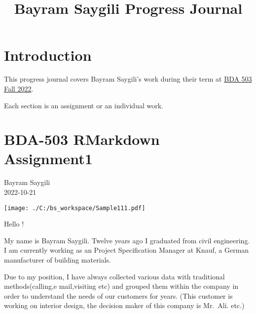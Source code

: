 \documentclass[
  letterpaper,
  DIV=11,
  numbers=noendperiod]{scrreprt}
\title{Bayram Saygili Progress Journal}
\author{}
\date{}
\renewcommand*\contentsname{Table of contents}
\newcommand\contentsname{Table of contents}
\begin{document}
\maketitle
\ifdefined\Shaded\renewenvironment{Shaded}{\begin{tcolorbox}[sharp corners, interior hidden, enhanced, borderline west={3pt}{0pt}{shadecolor}, frame hidden, boxrule=0pt, breakable]}{\end{tcolorbox}}\fi

\renewcommand*\contentsname{Table of contents}
{
\hypersetup{linkcolor=}
\setcounter{tocdepth}{2}
\tableofcontents
}

\hypertarget{introduction}{%
\chapter*{Introduction}\label{introduction}}

This progress journal covers Bayram Saygili's work during their term at
\href{https://mef-bda503.github.io/fall22/}{BDA 503 Fall 2022}.

Each section is an assignment or an individual work.


\hypertarget{bda-503-rmarkdown-assignment1}{%
\chapter{\texorpdfstring{\textbf{BDA-503 RMarkdown
Assignment1}}{BDA-503 RMarkdown Assignment1}}\label{bda-503-rmarkdown-assignment1}}

Bayram Saygili\\
2022-10-21

\hfill\break

\texttt{[image: ./C:/bs\_workspace/Sample111.pdf]}

Hello !

My name is Bayram Saygili. Twelve years ago I graduated from civil
engineering. I am currently working as an Project Specification Manager
at Knauf, a German manufacturer of building materials.

Due to my position, I have always collected various data with
traditional methods(calling,e mail,visiting etc) and grouped them within
the company in order to understand the needs of our customers for years.
(This customer is working on interior design, the decision maker of this
company is Mr.~Ali. etc.)
\end{document}
